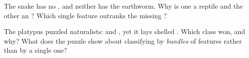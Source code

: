 \begin{exercise}[$\star\star$]\label{exo:g4:classifying-animals:10}
The snake has no , and neither has the earthworm. Why is
one a  reptile and the other an ? Which
single feature outranks the missing ?
\end{exercise}

\begin{exercise}[$\star\star\star$]\label{exo:g4:classifying-animals:11}
The platypus puzzled naturalists:  and , yet it lays
shelled . Which class won, and why? What does the puzzle
show about classifying by \emph{bundles} of features rather
than by a single one?
\end{exercise}
